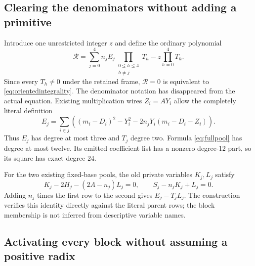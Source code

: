 \subsection{Clearing the denominators without adding a primitive}

Introduce one unrestricted integer $z$ and define the ordinary polynomial
\begin{equation}\label{eq:fullpool}
 \mathcal R=
 \sum_{j=0}^{4}n_jE_j\!\prod_{\substack{0\le h\le4\\h\ne j}}T_h
 -z\prod_{h=0}^{4}T_h.
\end{equation}
Since every $T_h\ne0$ under the retained frame, $\mathcal R=0$ is
equivalent to \eqref{eq:orientedintegrality}. The denominator notation
has disappeared from the actual equation. Existing multiplication wires
$Z_i=AY_i$ allow the completely literal definition
\[
 E_j=\sum_{i\in j}
 \left((m_i-D_i)^2-Y_i^2
       -2n_jY_i(m_i-D_i-Z_i)\right).
\]
Thus $E_j$ has degree at most three and $T_j$ degree two. Formula
\eqref{eq:fullpool} has degree at most twelve. Its emitted coefficient
list has a nonzero degree-12 part, so its square has exact degree 24.

For the two existing fixed-base pools, the old private variables
$K_j,L_j$ satisfy
\[
 K_j-2H_j-(2A-n_j)L_j=0,\qquad S_j-n_jK_j+L_j=0.
\]
Adding $n_j$ times the first row to the second gives $E_j-T_jL_j$.
The construction verifies this identity directly against the literal
parent rows; the block membership is not inferred from descriptive
variable names.

\subsection{Activating every block without assuming a positive radix}

